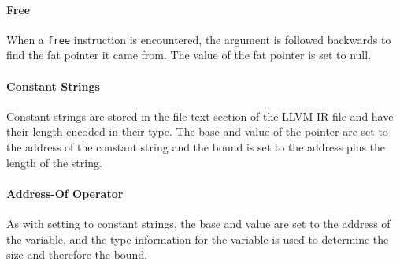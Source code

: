 \paragraph{Free}
When a \verb!free! instruction is encountered, the argument is followed backwards to find the fat pointer it came from.
The value of the fat pointer is set to null.

\paragraph{Constant Strings}
Constant strings are stored in the file text section of the LLVM IR file and have their length encoded in their type.
The base and value of the pointer are set to the address of the constant string and the bound is set to the address plus the length of the string.

%
%
%

\paragraph{Address-Of Operator}
As with setting to constant strings, the base and value are set to the address of the variable, and the type information for the variable is used to determine the size and therefore the bound.

%
%

